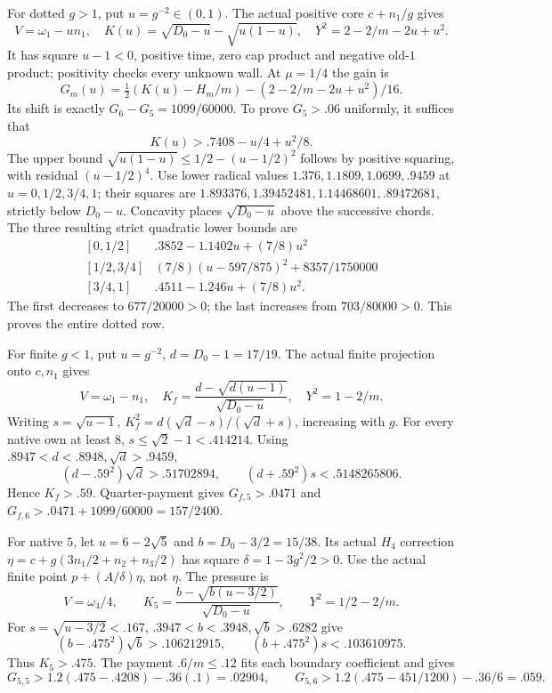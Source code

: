 \documentclass[11pt]{article}
\theoremstyle{definition}
\theoremstyle{remark}
\begin{document}
For dotted \(g>1\), put \(u=g^{-2}\in(0,1)\).
The actual positive core \(c+n_1/g\) gives
\[
 V=\omega_1-un_1,\quad
 K(u)=\sqrt{D_0-u}-\sqrt{u(1-u)},\quad
 Y^2=2-2/m-2u+u^2.
\]
It has square \(u-1<0\), positive time,
zero cap product and negative old-\(1\)
product; positivity checks every unknown wall.
At \(\mu=1/4\) the gain is
\[
 G_m(u)=\tfrac12(K(u)-H_m/m)
        -(2-2/m-2u+u^2)/16.
\]
Its shift is exactly
\(G_6-G_5=1099/60000\).
To prove \(G_5>.06\) uniformly, it suffices that
\[
 K(u)>.7408-u/4+u^2/8.
\]
The upper bound
\(\sqrt{u(1-u)}\leq1/2-(u-1/2)^2\)
follows by positive squaring, with residual
\((u-1/2)^4\).
Use lower radical values \(1.376,1.1809,1.0699,.9459\)
at \(u=0,1/2,3/4,1\); their squares are
\(1.893376,1.39452481,1.14468601,.89472681\),
strictly below \(D_0-u\).
Concavity places \(\sqrt{D_0-u}\) above the
successive chords. The three resulting
strict quadratic lower bounds are
\[
\begin{array}{c|l}
{}[0,1/2]&.3852-1.1402u+(7/8)u^2\\
{}[1/2,3/4]&
(7/8)(u-597/875)^2+8357/1750000\\
{}[3/4,1]&.4511-1.246u+(7/8)u^2.
\end{array}
\]
The first decreases to \(677/20000>0\);
the last increases from \(703/80000>0\).
This proves the entire dotted row.

For finite \(g<1\), put \(u=g^{-2}\), \(d=D_0-1=17/19\).
The actual finite projection onto \(c,n_1\)
gives
\[
 V=\omega_1-n_1,\quad
 K_f=\frac{d-\sqrt{d(u-1)}}{\sqrt{D_0-u}},\quad
 Y^2=1-2/m.
\]
Writing \(s=\sqrt{u-1}\),
\(K_f^2=d(\sqrt d-s)/(\sqrt d+s)\), increasing
with \(g\).
For every native own at least \(8\),
\(s\leq\sqrt2-1<.414214\).
Using \(.8947<d<.8948,\sqrt d>.9459\),
\[
 (d-.59^2)\sqrt d>.51702894,\qquad
 (d+.59^2)s<.5148265806.
\]
Hence \(K_f>.59\). Quarter-payment gives
\(G_{f,5}>.0471\) and
\(G_{f,6}>.0471+1099/60000=157/2400\).

For native \(5\), let \(u=6-2\sqrt5\) and
\(b=D_0-3/2=15/38\).
Its actual \(H_4\) correction
\(\eta=c+g(3n_1/2+n_2+n_3/2)\)
has square \(\delta=1-3g^2/2>0\).
Use the actual finite point
\(p+(A/\delta)\eta\), not \(\eta\).
The pressure is
\[
 V=\omega_4/4,\qquad
 K_5=\frac{b-\sqrt{b(u-3/2)}}{\sqrt{D_0-u}},
 \qquad Y^2=1/2-2/m.
\]
For \(s=\sqrt{u-3/2}<.167\),
\(.3947<b<.3948,\sqrt b>.6282\) give
\[
 (b-.475^2)\sqrt b>.106212915,\qquad
 (b+.475^2)s<.103610975.
\]
Thus \(K_5>.475\).
The payment \(.6/m\leq.12\) fits each
boundary coefficient and gives
\[
 G_{5,5}>1.2(.475-.4208)-.36(.1)=.02904,\qquad
 G_{5,6}>1.2(.475-451/1200)-.36/6=.059.
\]
\end{document}
